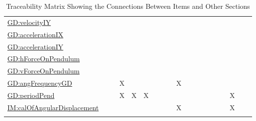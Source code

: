 \documentclass[12pt]{article}
\begin{document}
\begin{longtable}{l l l l l l l l l l l l l l l l l l l}
\hyperref[GD:velocityIY]{GD:velocityIY} &  &  &  &  &  &  &  &  &  &  &  &  &  &  &  &  &  & 
\\
\hyperref[GD:accelerationIX]{GD:accelerationIX} &  &  &  &  &  &  &  &  &  &  &  &  &  &  &  &  &  & 
\\
\hyperref[GD:accelerationIY]{GD:accelerationIY} &  &  &  &  &  &  &  &  &  &  &  &  &  &  &  &  &  & 
\\
\hyperref[GD:hForceOnPendulum]{GD:hForceOnPendulum} &  &  &  &  &  &  &  &  &  &  &  &  &  &  &  &  &  & 
\\
\hyperref[GD:vForceOnPendulum]{GD:vForceOnPendulum} &  &  &  &  &  &  &  &  &  &  &  &  &  &  &  &  &  & 
\\
\hyperref[GD:angFrequencyGD]{GD:angFrequencyGD} &  &  & X &  &  &  &  &  & X &  &  &  &  &  &  &  &  & 
\\
\hyperref[GD:periodPend]{GD:periodPend} &  &  & X & X & X &  &  &  &  &  &  &  &  &  &  & X &  & 
\\
\hyperref[IM:calOfAngularDisplacement]{IM:calOfAngularDisplacement} &  &  &  &  &  &  &  &  & X &  &  &  &  &  &  & X &  & 
\\
\bottomrule
\caption{Traceability Matrix Showing the Connections Between Items and Other Sections}
\label{Table:TraceMatRefvsRef}
\end{longtable}
\end{document}
